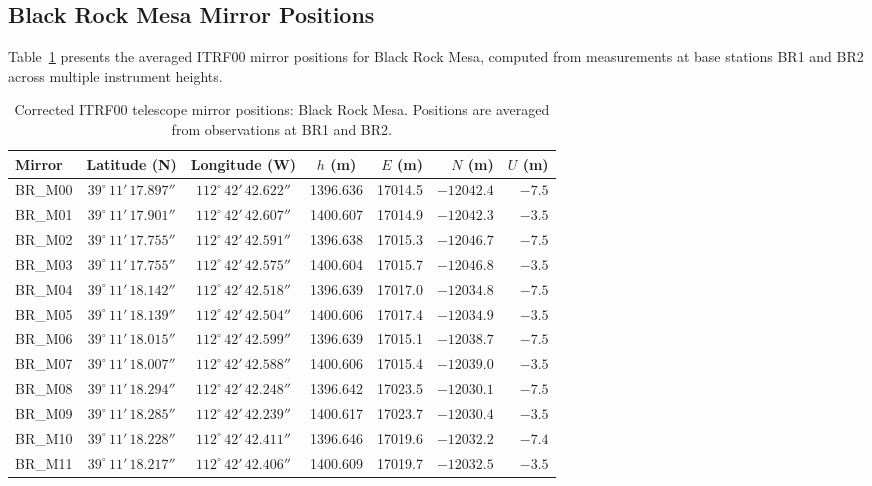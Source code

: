 \documentclass[11pt,letterpaper]{article}
\newcommand{\degree}{^\circ}
\begin{document}
\subsection{Black Rock Mesa Mirror Positions}

Table~\ref{tab:br_mirrors} presents the averaged ITRF00 mirror positions for Black Rock Mesa, computed from measurements at base stations BR1 and BR2 across multiple instrument heights.

\begin{table}[H]
\centering
\caption{Corrected ITRF00 telescope mirror positions: Black Rock Mesa. Positions are averaged from observations at BR1 and BR2.}
\label{tab:br_mirrors}
\smallskip
\footnotesize
\begin{tabular}{@{}lcccrrr@{}}
\toprule
{Mirror} & {Latitude (N)} & {Longitude (W)} & {$h$ (m)} & {$E$ (m)} & {$N$ (m)} & {$U$ (m)} \\
\midrule
BR\_M00 & $39\degree\,11'\,17.897''$ & $112\degree\,42'\,42.622''$ & 1396.636 & 17014.5 & $-12042.4$ & $-7.5$ \\
BR\_M01 & $39\degree\,11'\,17.901''$ & $112\degree\,42'\,42.607''$ & 1400.607 & 17014.9 & $-12042.3$ & $-3.5$ \\
BR\_M02 & $39\degree\,11'\,17.755''$ & $112\degree\,42'\,42.591''$ & 1396.638 & 17015.3 & $-12046.7$ & $-7.5$ \\
BR\_M03 & $39\degree\,11'\,17.755''$ & $112\degree\,42'\,42.575''$ & 1400.604 & 17015.7 & $-12046.8$ & $-3.5$ \\
BR\_M04 & $39\degree\,11'\,18.142''$ & $112\degree\,42'\,42.518''$ & 1396.639 & 17017.0 & $-12034.8$ & $-7.5$ \\
BR\_M05 & $39\degree\,11'\,18.139''$ & $112\degree\,42'\,42.504''$ & 1400.606 & 17017.4 & $-12034.9$ & $-3.5$ \\
BR\_M06 & $39\degree\,11'\,18.015''$ & $112\degree\,42'\,42.599''$ & 1396.639 & 17015.1 & $-12038.7$ & $-7.5$ \\
BR\_M07 & $39\degree\,11'\,18.007''$ & $112\degree\,42'\,42.588''$ & 1400.606 & 17015.4 & $-12039.0$ & $-3.5$ \\
BR\_M08 & $39\degree\,11'\,18.294''$ & $112\degree\,42'\,42.248''$ & 1396.642 & 17023.5 & $-12030.1$ & $-7.5$ \\
BR\_M09 & $39\degree\,11'\,18.285''$ & $112\degree\,42'\,42.239''$ & 1400.617 & 17023.7 & $-12030.4$ & $-3.5$ \\
BR\_M10 & $39\degree\,11'\,18.228''$ & $112\degree\,42'\,42.411''$ & 1396.646 & 17019.6 & $-12032.2$ & $-7.4$ \\
BR\_M11 & $39\degree\,11'\,18.217''$ & $112\degree\,42'\,42.406''$ & 1400.609 & 17019.7 & $-12032.5$ & $-3.5$ \\
\bottomrule
\end{tabular}
\end{table}
\end{document}
